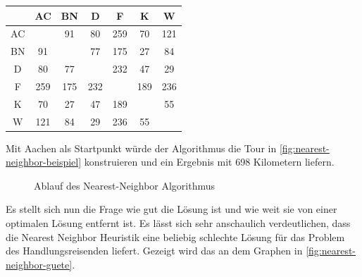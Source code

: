 \documentclass{article}
\begin{document}
\begin{table}
\centering
\label{tbl:opt-struktur-select-reduktion}
\begin{tabular}{ |c|c|c|c|c|c|c| }
\hline
 & AC & BN & D& F & K & W \\ 
\hline
AC &  & 91 & 80 & 259 & 70 & 121 \\ 
\hline
BN & 91 &  & 77 & 175 & 27 & 84 \\ 
\hline
D & 80 & 77 &  & 232 & 47 & 29 \\ 
\hline
F & 259 & 175 & 232 &  & 189 & 236 \\ 
\hline
K & 70 & 27 & 47 & 189 &  & 55 \\ 
\hline
W & 121 & 84 & 29 & 236 & 55 &  \\ 
\hline
\end{tabular}
\end{table}

Mit Aachen als Startpunkt würde der Algorithmus die Tour in \autoref{fig:nearest-neighbor-beispiel} konstruieren und ein Ergebnis mit 698 Kilometern liefern.

\begin{figure}[H]
\centering
{}
\caption{Ablauf des Nearest-Neighbor Algorithmus}
\label{fig:nearest-neighbor-beispiel}
\end{figure}

Es stellt sich nun die Frage wie gut die Lösung ist und wie weit sie von einer optimalen Lösung entfernt ist. Es lässt sich sehr anschaulich verdeutlichen, dass die Nearest Neighbor Heuristik eine beliebig schlechte Lösung für das Problem des Handlungsreisenden liefert. Gezeigt wird das an dem Graphen in \autoref{fig:nearest-neighbor-guete}.
\end{document}
